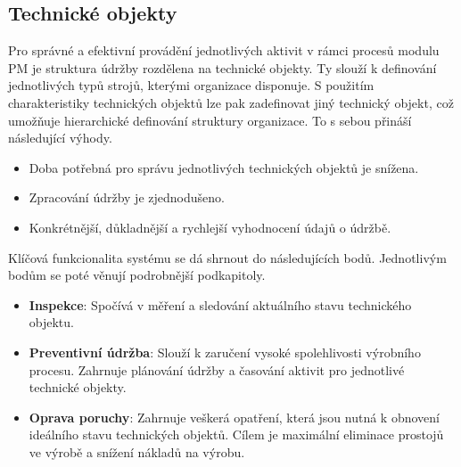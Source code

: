 \documentclass[thesis=M,czech]{FITthesis}[2012/06/26]
\begin{document}
\subsection{Technické objekty}
Pro správné a efektivní provádění jednotlivých aktivit v rámci procesů modulu PM je struktura údržby rozdělena na technické objekty. Ty slouží k definování jednotlivých typů strojů, kterými organizace disponuje. S použitím charakteristiky technických objektů lze pak zadefinovat jiný technický objekt, což umožňuje hierarchické definování struktury organizace. To s sebou přináší následující výhody.
\begin{itemize}
	\item
	Doba potřebná pro správu jednotlivých technických objektů je snížena.
	\item
	Zpracování údržby je zjednodušeno.
	\item
	Konkrétnější, důkladnější a rychlejší vyhodnocení údajů o údržbě.
\end{itemize}
Klíčová funkcionalita systému se dá shrnout do následujících bodů. Jednotlivým bodům se poté věnují podrobnější podkapitoly.
\begin{itemize}
	\item
	\textbf{Inspekce}: Spočívá v měření a sledování aktuálního stavu technického objektu.
	\item
	\textbf{Preventivní údržba}: Slouží k zaručení vysoké spolehlivosti výrobního procesu. Zahrnuje plánování údržby a časování aktivit pro jednotlivé technické objekty.
	\item
	\textbf{Oprava poruchy}: Zahrnuje veškerá opatření, která jsou nutná k obnovení ideálního stavu technických objektů. Cílem je maximální eliminace prostojů ve výrobě a snížení nákladů na výrobu.
\end{itemize}
\end{document}
